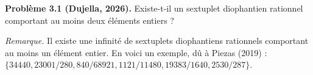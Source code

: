 \textbf{Problème 3.1 (Dujella, 2026).} Existe-t-il un sextuplet diophantien rationnel comportant au moins deux éléments entiers ?

\medskip

\textit{Remarque.} Il existe une infinité de sextuplets diophantiens rationnels comportant au moins un élément entier. En voici un exemple, dû à Piezas (2019) : $\{34440, 23001/280, 840/68921, 1121/11480, 19383/1640, 2530/287\}$.
